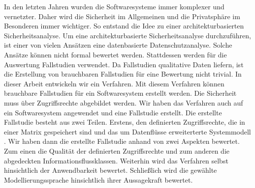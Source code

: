 
\Abstract
In den letzten Jahren wurden die Softwaresysteme immer komplexer und vernetzter. Daher wird die Sicherheit im Allgemeinen und die Privatsphäre im Besonderen immer wichtiger. So entstand die Idee zu einer architekturbasierten Sicherheitsanalyse.  Um eine architekturbasierte Sicherheitsanalyse durchzuführen, ist einer von vielen Ansätzen eine datenbasierte Datenschutzanalyse. Solche Ansätze können nicht formal bewertet werden. Stattdessen werden für die Auswertung Fallstudien verwendet. Da Fallstudien qualitative Daten liefern, ist die Erstellung von brauchbaren Fallstudien für eine Bewertung nicht trivial. In dieser Arbeit entwickeln wir ein Verfahren. Mit diesem Verfahren können brauchbare Fallstudien für ein Softwaresystem erstellt werden. Die Sicherheit muss über Zugriffsrechte abgebildet werden. Wir haben das Verfahren auch auf ein Softwaresystem angewendet und eine Fallstudie erstellt. Die erstellte Fallstudie besteht aus zwei Teilen. Erstens, den definierten Zugriffsrechte, die in einer Matrix gespeichert sind und das  um Datenflüsse erweiterterte Systemmodell . Wir haben dann die erstellte Fallstudie anhand von zwei Aspekten bewertet. Zum einen die Qualität der definierten Zugriffsrechte und zum anderen die abgedeckten Informationsflussklassen. Weiterhin wird das Verfahren selbst hinsichtlich der Anwendbarkeit bewertet. Schließlich wird die gewählte Modellierungssprache hinsichtlich ihrer Aussagekraft bewertet.
